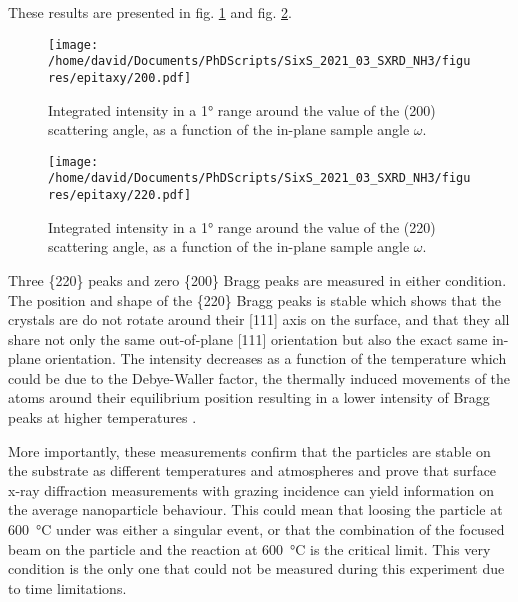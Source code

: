 These results are presented in fig. \ref{fig:Epitaxy200} and fig. \ref{fig:Epitaxy220}.

\begin{figure}[!htb]
    \centering
    \texttt{[image: /home/david/Documents/PhDScripts/SixS\_2021\_03\_SXRD\_NH3/figures/epitaxy/200.pdf]}
    \caption{
        Integrated intensity in a \ang{1} range around the value of the (200) scattering angle, as a function of the in-plane sample angle $\omega$.
    }
    \label{fig:Epitaxy200}
\end{figure}

\begin{figure}[!htb]
    \centering
    \texttt{[image: /home/david/Documents/PhDScripts/SixS\_2021\_03\_SXRD\_NH3/figures/epitaxy/220.pdf]}
    \caption{
        Integrated intensity in a \ang{1} range around the value of the (220) scattering angle, as a function of the in-plane sample angle $\omega$.
    }
    \label{fig:Epitaxy220}
\end{figure}

Three \{220\} peaks and zero \{200\} Bragg peaks are measured in either condition.
The position and shape of the \{220\} Bragg peaks is stable which shows that the crystals are do not rotate around their [111] axis on the surface, and that they all share not only the same out-of-plane [111] orientation but also the exact same in-plane orientation.
The intensity decreases as a function of the temperature which could be due to the Debye-Waller factor, the thermally induced movements of the atoms around their equilibrium position resulting in a lower intensity of Bragg peaks at higher temperatures \parencite{Willmott}.

More importantly, these measurements confirm that the particles are stable on the substrate as different temperatures and atmospheres and prove that surface x-ray diffraction measurements with grazing incidence can yield information on the average nanoparticle behaviour.
This could mean that loosing the particle at \qty{600}{\degreeCelsius} under \ammonia was either a singular event, or that the combination of the focused beam on the particle and the reaction at \qty{600}{\degreeCelsius} is the critical limit.
This very condition is the only one that could not be measured during this experiment due to time limitations.


